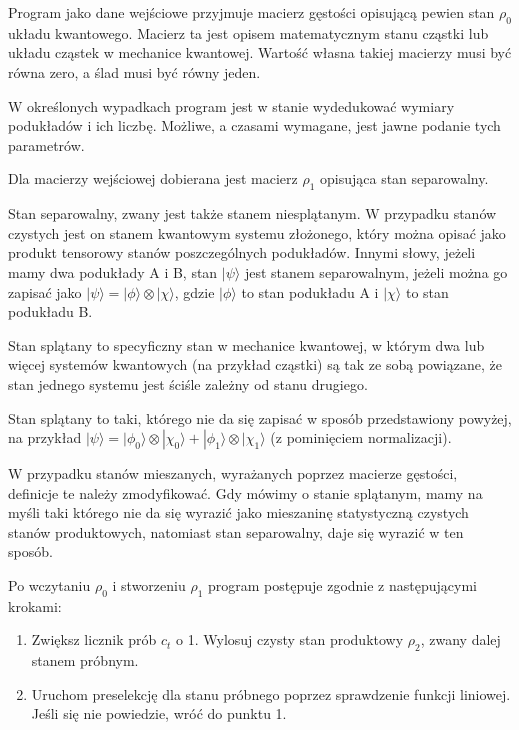 \documentclass[11pt, a4paper]{article}
\begin{document}
\begin{sloppypar}
    Program jako dane wejściowe przyjmuje macierz gęstości opisującą pewien stan
    $\rho_{0}$ układu kwantowego. Macierz ta jest opisem matematycznym stanu cząstki lub
    układu cząstek w mechanice kwantowej. Wartość własna takiej macierzy musi być równa
    zero, a ślad musi być równy jeden.

    W określonych wypadkach program jest w stanie wydedukować wymiary podukładów i ich liczbę.
    Możliwe, a czasami wymagane, jest jawne podanie tych parametrów.

    Dla macierzy wejściowej dobierana jest macierz $\rho_{1}$ opisująca stan separowalny.

    Stan separowalny, zwany jest także stanem niesplątanym. W przypadku stanów czystych
    jest on stanem kwantowym systemu złożonego, który można opisać jako produkt tensorowy
    stanów poszczególnych podukładów. Innymi słowy, jeżeli mamy dwa podukłady A i B,
    stan $|\psi \rangle$ jest stanem separowalnym, jeżeli można go zapisać jako $|\psi\rangle
    = |\phi\rangle \otimes |\chi\rangle$, gdzie $| \phi\rangle$ to stan podukładu A i
    $|\chi\rangle$ to stan podukładu B.

    Stan splątany to specyficzny stan w mechanice kwantowej, w którym dwa lub więcej systemów
    kwantowych (na przykład cząstki) są tak ze sobą powiązane, że stan jednego systemu
    jest ściśle zależny od stanu drugiego.

    Stan splątany to taki, którego nie da się zapisać w sposób przedstawiony powyżej, na
    przykład
    $|\psi\rangle = |\phi_{0}\rangle \otimes |\chi_{0}\rangle + |\phi_{1}\rangle \otimes
    |\chi_{1}\rangle$
    (z pominięciem normalizacji).

    W przypadku stanów mieszanych, wyrażanych poprzez macierze gęstości, definicje te
    należy zmodyfikować. Gdy mówimy o stanie splątanym, mamy na myśli taki którego nie
    da się wyrazić jako mieszaninę statystyczną czystych stanów produktowych, natomiast stan
    separowalny, daje się wyrazić w ten sposób.

    Po wczytaniu $\rho_{0}$ i stworzeniu $\rho_{1}$ program postępuje zgodnie z
    następującymi krokami:

    \begin{enumerate}
      \item Zwiększ licznik prób $c_{t}$ o 1. Wylosuj czysty stan produktowy $\rho_{2}$,
        zwany dalej stanem próbnym.

      \item Uruchom preselekcję dla stanu próbnego poprzez sprawdzenie funkcji liniowej.
        Jeśli się nie powiedzie, wróć do punktu 1.


\end{enumerate}
\end{sloppypar}
\end{document}
